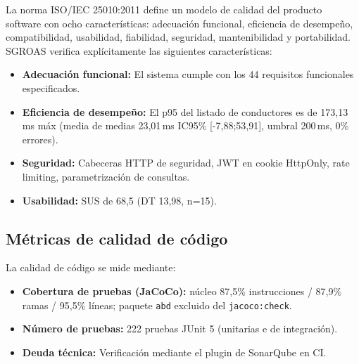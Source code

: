 La norma ISO/IEC 25010:2011 \cite{iso25010} define un modelo de calidad del producto software con ocho características: adecuación funcional, eficiencia de desempeño, compatibilidad, usabilidad, fiabilidad, seguridad, mantenibilidad y portabilidad. SGROAS verifica explícitamente las siguientes características:
\begin{itemize}
  \item \textbf{Adecuación funcional:} El sistema cumple con los 44 requisitos funcionales especificados.
  \item \textbf{Eficiencia de desempeño:} El p95 del listado de conductores es de 173,13\,ms máx (media de medias 23,01\,ms IC95\% [-7,88;53,91], umbral 200\,ms, 0\% errores).
  \item \textbf{Seguridad:} Cabeceras HTTP de seguridad, JWT en cookie HttpOnly, rate limiting, parametrización de consultas.
  \item \textbf{Usabilidad:} SUS de 68,5 (DT 13,98, n=15).
\end{itemize}

\subsection{Métricas de calidad de código}
\label{sec:code-quality}

La calidad de código se mide mediante:
\begin{itemize}
  \item \textbf{Cobertura de pruebas (JaCoCo):} núcleo 87,5\% instrucciones / 87,9\% ramas / 95,5\% líneas; paquete \texttt{abd} excluido del \texttt{jacoco:check}.
  \item \textbf{Número de pruebas:} 222 pruebas JUnit 5 (unitarias e de integración).
  \item \textbf{Deuda técnica:} Verificación mediante el plugin de SonarQube en CI.
\end{itemize}
